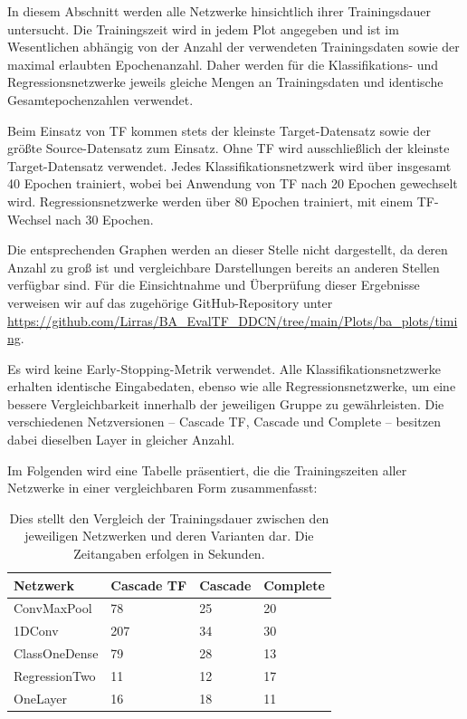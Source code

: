 In diesem Abschnitt werden alle Netzwerke hinsichtlich ihrer Trainingsdauer untersucht. Die Trainingszeit wird in jedem Plot angegeben und ist im Wesentlichen abhängig von der Anzahl der verwendeten Trainingsdaten sowie der maximal erlaubten Epochenanzahl. Daher werden für die 
Klassifikations- und Regressionsnetzwerke jeweils gleiche Mengen an Trainingsdaten und identische Gesamtepochenzahlen verwendet.

Beim Einsatz von TF kommen stets der kleinste Target-Datensatz sowie der größte Source-Datensatz zum Einsatz. Ohne TF wird 
ausschließlich der kleinste Target-Datensatz verwendet. Jedes Klassifikationsnetzwerk wird über insgesamt 40 Epochen trainiert, wobei bei 
Anwendung von TF nach 20 Epochen gewechselt wird. Regressionsnetzwerke werden über 80 Epochen trainiert, mit einem TF-Wechsel nach 30 Epochen.

Die entsprechenden Graphen werden an dieser Stelle nicht dargestellt, da deren Anzahl zu groß ist und vergleichbare Darstellungen bereits an 
anderen Stellen verfügbar sind. Für die Einsichtnahme und Überprüfung dieser Ergebnisse verweisen wir auf das zugehörige GitHub-Repository 
unter \url{https://github.com/Lirras/BA_EvalTF_DDCN/tree/main/Plots/ba_plots/timing}. 

Es wird keine Early-Stopping-Metrik verwendet. Alle Klassifikationsnetzwerke erhalten identische Eingabedaten, ebenso wie alle 
Regressionsnetzwerke, um eine bessere Vergleichbarkeit innerhalb der jeweiligen Gruppe zu gewährleisten. Die verschiedenen Netzversionen – 
Cascade TF, Cascade und Complete – besitzen dabei dieselben Layer in gleicher Anzahl.

Im Folgenden wird eine Tabelle präsentiert, die die Trainingszeiten aller Netzwerke in einer vergleichbaren Form zusammenfasst:

\begin{table}[h!]
    \begin{center} 
        \begin{tabular}{l|l|l|l}
            \textbf{Netzwerk} & \textbf{Cascade TF} & \textbf{Cascade} & \textbf{Complete} \\
            \hline
            ConvMaxPool & 78 & 25 & 20 \\
            1DConv & 207 & 34 & 30 \\
            ClassOneDense & 79 & 28 & 13 \\
            RegressionTwo & 11 & 12 & 17 \\
            OneLayer & 16 & 18 & 11
        \end{tabular}
        \caption{
            \small{Dies stellt den Vergleich der Trainingsdauer zwischen den jeweiligen Netzwerken und deren Varianten dar. Die Zeitangaben erfolgen in Sekunden.}}
        \label{tab:time}
    \end{center}
\end{table}

